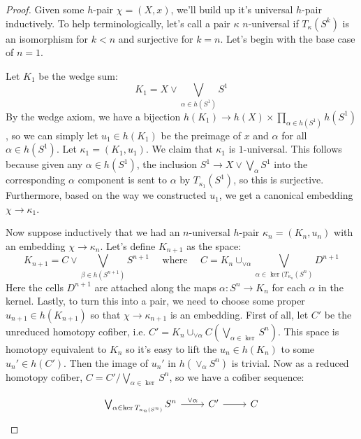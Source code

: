 \documentclass[11pt,letterpaper]{article}
\begin{document}
\begin{proof}
    Given some $h$-pair $\chi = (X,x)$, we'll build up it's universal $h$-pair inductively. To help terminologically, let's call a pair $\kappa$ $n$-universal if $T_\kappa(S^k)$ is an isomorphism for $k < n$ and surjective for $k = n$. Let's begin with the base case of $n=1$.

    Let $K_1$ be the wedge sum:
    \[ K_1 = X \vee \bigvee_{\alpha \in h(S^1)} S^1\]
    By the wedge axiom, we have a bijection $h(K_1) \to h(X)\times \prod_{\alpha \in h(S^1)} h(S^1)$, so we can simply let $u_1\in h(K_1)$ be the preimage of $x$ and $\alpha$ for all $\alpha\in h(S^1)$. Let $\kappa_1 = (K_1, u_1)$. We claim that $\kappa_1$ is $1$-universal. This follows because given any $\alpha \in h(S^1)$, the inclusion $S^1 \to X\vee \bigvee_\alpha S^1$ into the corresponding $\alpha$ component is sent to $\alpha$ by $T_{\kappa_1}(S^1)$, so this is surjective. Furthermore, based on the way we constructed $u_1$, we get a canonical embedding $\chi \to \kappa_1$.

    Now suppose inductively that we had an $n$-universal $h$-pair $\kappa_n=(K_n, u_n)$ with an embedding $\chi \to \kappa_n$. Let's define $K_{n+1}$ as the space:
    \[ K_{n+1} = C \vee \bigvee_{\beta\in h(S^{n+1})}S^{n+1}\quad\text{ where }\quad C = K_n\cup_{\vee\alpha} \bigvee_{\alpha\in \ker(T_{\kappa_n}(S^n)} D^{n+1}\]
    Here the cells $D^{n+1}$ are attached along the maps $\alpha : S^n \to K_n$ for each $\alpha$ in the kernel. Lastly, to turn this into a pair, we need to choose some proper $u_{n+1}\in h(K_{n+1})$ so that $\chi \to \kappa_{n+1}$ is an embedding. First of all, let $C'$ be the unreduced homotopy cofiber, i.e. $C'=K_n\cup_{\vee \alpha} C\left(\bigvee_{\alpha\in \ker} S^n\right)$. This space is homotopy equivalent to $K_n$ so it's easy to lift the $u_n\in h(K_n)$ to some $u_n'\in h(C')$. Then the image of $u_n'$ in $h(\vee_\alpha S^n)$ is trivial. Now as a reduced homotopy cofiber, $C = C' / \bigvee_{\alpha \in \ker} S^n$, so we have a cofiber sequence:

    \[\begin{tikzcd}
	    {\bigvee_{\alpha\in\ker T_{\kappa_n(S^n)}}S^n} & {C'} & {C}
	    \arrow["{\vee \alpha}", from=1-1, to=1-2]
	    \arrow[from=1-2, to=1-3]
    \end{tikzcd}\]


\end{proof}
\end{document}
